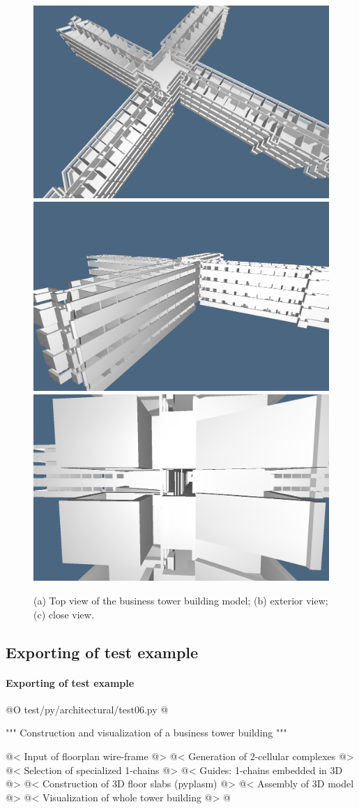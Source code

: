 \documentclass[11pt,oneside]{article}    %
\begin{document}
\begin{figure}[htbp] %
   \centering
   \includegraphics[width=0.325\linewidth]{images/tower1} 
   \includegraphics[width=0.325\linewidth]{images/tower2} 
   \includegraphics[width=0.325\linewidth]{images/tower3} 
   \caption{(a) Top view of the business tower building model; (b) exterior view; (c) close view.}
   \label{fig:towerplan1}
\end{figure}


\subsection{Exporting of test example}

\paragraph{Exporting of test example}
@O test/py/architectural/test06.py
@{""" Construction and visualization of a business tower building """

@< Input of floorplan wire-frame @>
@< Generation of 2-cellular complexes @>
@< Selection of specialized 1-chains @>
@< Guides: 1-chains embedded in 3D @>
@< Construction of 3D floor slabs (pyplasm) @>
@< Assembly of 3D model @>
@< Visualization of whole tower building @>
@}
\end{document}

